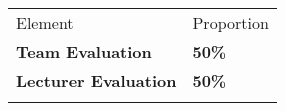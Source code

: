 \begin{table}[h!]
     \begin{center}
     \begin{tabular}{p{7cm}  p{3cm} }
     \toprule
      \textbf\large{Element} & \textbf\large{Proportion} \\ 
    \cmidrule(r){1-1}\cmidrule(lr){2-2}
      \textbf{Team Evaluation} & \textbf{50\%}\\
      \textbf{Lecturer Evaluation} & \textbf{50\%}\\    
      \\ \bottomrule
      \end{tabular}
      \label{tbl:markSchemeAsmt3}
      \end{center}
 \end{table}

